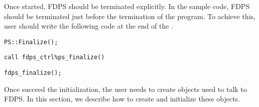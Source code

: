 Once started, FDPS should be terminated explicitly. In the sample code, FDPS should be terminated just before the termination of the program. To achieve this, user should write the following code at the end of the \mainFunc.
\ifCpp %
\begin{lstlisting}[caption=Termination of FDPS]
PS::Finalize();
\end{lstlisting}
\endifCpp
\ifFtn %
\begin{lstlisting}[caption=Termination of FDPS]
call fdps_ctrl%ps_finalize()
\end{lstlisting}
\endifFtn
\ifC %
\begin{lstlisting}[caption=Termination of FDPS]
fdps_finalize();
\end{lstlisting}
\endifC


Once succeed the initialization, the user needs to create objects used to talk to FDPS. In this section, we describe how to create and initialize these objects.

